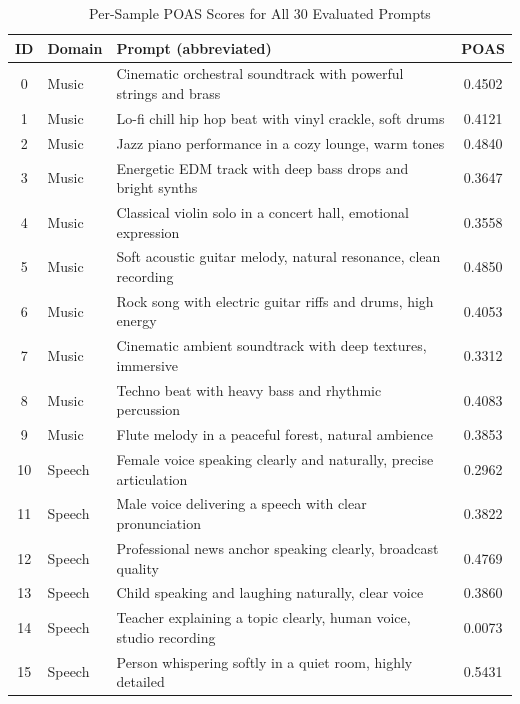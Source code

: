 \documentclass[journal]{IEEEtran}
\begin{document}
\begin{table}[!t]
  \renewcommand{\arraystretch}{1.25}
  \caption{Per-Sample POAS Scores for All 30 Evaluated Prompts}
  \label{tab:per_sample}
  \centering
  \begin{tabular}{|c|l|l|c|}
  \hline
  \textbf{ID} & \textbf{Domain} & \textbf{Prompt (abbreviated)} & \textbf{POAS} \\
  \hline
  0  & Music  & Cinematic orchestral soundtrack with powerful strings and brass        & 0.4502 \\
  1  & Music  & Lo-fi chill hip hop beat with vinyl crackle, soft drums                & 0.4121 \\
  2  & Music  & Jazz piano performance in a cozy lounge, warm tones                   & 0.4840 \\
  3  & Music  & Energetic EDM track with deep bass drops and bright synths             & 0.3647 \\
  4  & Music  & Classical violin solo in a concert hall, emotional expression          & 0.3558 \\
  5  & Music  & Soft acoustic guitar melody, natural resonance, clean recording        & 0.4850 \\
  6  & Music  & Rock song with electric guitar riffs and drums, high energy            & 0.4053 \\
  7  & Music  & Cinematic ambient soundtrack with deep textures, immersive             & 0.3312 \\
  8  & Music  & Techno beat with heavy bass and rhythmic percussion                    & 0.4083 \\
  9  & Music  & Flute melody in a peaceful forest, natural ambience                    & 0.3853 \\
  \hline
  10 & Speech & Female voice speaking clearly and naturally, precise articulation      & 0.2962 \\
  11 & Speech & Male voice delivering a speech with clear pronunciation                & 0.3822 \\
  12 & Speech & Professional news anchor speaking clearly, broadcast quality           & 0.4769 \\
  13 & Speech & Child speaking and laughing naturally, clear voice                     & 0.3860 \\
  14 & Speech & Teacher explaining a topic clearly, human voice, studio recording      & 0.0073 \\
  15 & Speech & Person whispering softly in a quiet room, highly detailed              & 0.5431 \\

\end{tabular}
\end{table}
\end{document}

